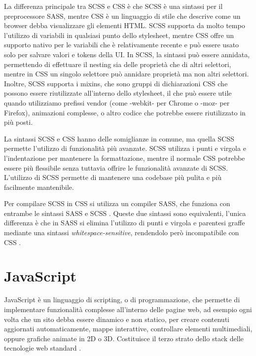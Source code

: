 La differenza principale tra SCSS e CSS è che SCSS è una sintassi per il preprocessore SASS, mentre CSS è un linguaggio di stile che descrive come un browser debba visualizzare gli elementi HTML. SCSS supporta da molto tempo l'utilizzo di variabili in qualsiasi punto dello stylesheet, mentre CSS offre un supporto nativo per le variabili che è relativamente recente e può essere usato solo per salvare valori e tokens della UI. In SCSS, la sintassi può essere annidata, permettendo di effettuare il nesting sia delle proprietà che di altri selettori, mentre in CSS un singolo selettore può annidare proprietà ma non altri selettori. Inoltre, SCSS supporta i mixins, che sono gruppi di dichiarazioni CSS che possono essere riutilizzate all'interno dello stylesheet, il che può essere utile quando utilizziamo prefissi vendor (come -webkit- per Chrome o -moz- per Firefox), animazioni complesse, o altro codice che potrebbe essere riutilizzato in più posti.

La sintassi SCSS e CSS hanno delle somiglianze in comune, ma quella SCSS permette l'utilizzo di funzionalità più avanzate. SCSS utilizza i punti e virgola e l'indentazione per mantenere la formattazione, mentre il normale CSS potrebbe essere più flessibile senza tuttavia offrire le funzionalità avanzate di SCSS. L'utilizzo di SCSS permette di mantenere una codebase più pulita e più facilmente mantenibile.

Per compilare SCSS in CSS si utilizza un compiler SASS, che funziona con entrambe le sintassi SASS e SCSS \cite{SCSS}. Queste due sintassi sono equivalenti, l'unica differenza è che in SASS si elimina l'utilizzo di punti e virgola e parentesi graffe mediante una sintassi \textit{whitespace-sensitive}, rendendolo però incompatibile con CSS \cite{SASS}.

\section{JavaScript}
JavaScript è un linguaggio di scripting, o di programmazione, che permette di implementare funzionalità complesse all'interno delle pagine web, ad esempio ogni volta che un sito debba essere dinamico e non statico, per creare contenuti aggiornati automaticamente, mappe interattive, controllare elementi multimediali, oppure grafiche animate in 2D o 3D. Costituisce il terzo strato dello stack delle tecnologie web standard \cite{JavaScript, JavaScript_Mozilla}.

